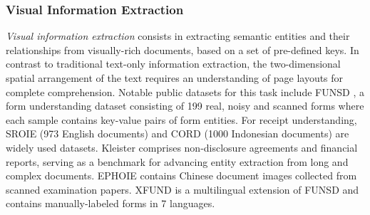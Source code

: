 \subsubsection{Visual Information Extraction}

\textit{Visual information extraction} consists in extracting semantic entities and their relationships from visually-rich documents, based on a set of pre-defined keys. In contrast to traditional text-only information extraction, the two-dimensional spatial arrangement of the text requires an understanding of page layouts for complete comprehension. Notable public datasets for this task include \ac{FUNSD} \citep{jaume2019funsd}, a form understanding dataset consisting of 199 real, noisy and scanned forms where each sample contains key-value pairs of form entities. For receipt understanding, \ac{SROIE} \citep{huang2019icdar2019} (973 English documents) and \ac{CORD} \citep{park2019cord} (1000 Indonesian documents) are widely used datasets. Kleister \citep{gralinski2020kleister} comprises non-disclosure agreements and financial reports, serving as a benchmark for advancing entity extraction from long and complex documents. EPHOIE \citep{wang2021towards} contains Chinese document images collected from scanned examination papers. XFUND is a multilingual extension of \ac{FUNSD} \citep{xu-etal-2022-xfund} and contains manually-labeled forms in 7 languages.




